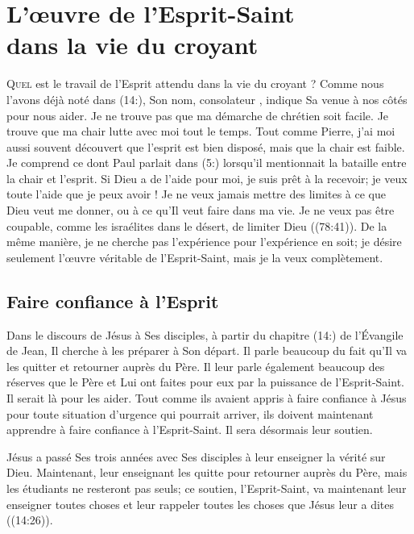 \chapter[L'\oe{}uvre de l'Esprit-Saint dans la vie du croyant]{L'\oe{}uvre de l'Esprit-Saint\\ dans la vie du croyant}

\lettrine{Q}{uel} est le travail de l'Esprit
 attendu dans la vie du croyant ?
 Comme nous l'avons déjà noté dans (14:), Son nom,
 \og con\-so\-la\-teur \fg{}, indique Sa venue à nos côtés pour nous aider.
 Je ne trouve pas que ma démarche de chrétien soit facile.
 Je trouve que ma chair lutte avec moi tout le temps.
 Tout comme Pierre, j'ai moi aussi souvent découvert que l'esprit
 est bien disposé, mais que la chair est faible.
 Je comprend ce dont Paul parlait dans (5:) lorsqu'il
 mentionnait la bataille entre la chair et l'esprit.
 Si Dieu a de l'aide pour moi, je suis prêt à la recevoir;
 je veux toute l'aide que je peux avoir !
 Je ne veux jamais mettre des limites à ce que Dieu veut me donner,
 ou à ce qu'Il veut faire dans ma vie. Je ne veux pas être coupable,
 comme les israélites dans le désert,
 de limiter Dieu ((78:41)).
 De la même manière, je ne cherche pas l'expérience
 pour l'expérience en soit; je désire seulement l'œuvre véritable
 de l'Esprit-Saint, mais je la veux complètement.

\section*{Faire confiance à l'Esprit}

Dans le discours de Jésus à Ses disciples, à partir du chapitre
 (14:) de l'Évangile de Jean,
 Il cherche à les préparer à Son départ.
 Il parle beaucoup du fait qu'Il va les quitter et retourner auprès du Père.
 Il leur parle également beaucoup des réserves que le Père et Lui
 ont faites pour eux par la puissance de l'Esprit-Saint.
 Il serait là pour les aider. Tout comme ils avaient appris à faire confiance
 à Jésus pour toute situation d'urgence qui pourrait arriver,
 ils doivent maintenant apprendre à faire confiance à l'Esprit-Saint.
 Il sera désormais leur soutien.

Jésus a passé Ses trois années avec Ses disciples à leur enseigner
 la vérité sur Dieu. Maintenant, leur enseignant les quitte pour retourner
 auprès du Père, mais les étudiants ne resteront pas seuls;
 ce soutien, l'Esprit-Saint, va maintenant leur enseigner toutes choses
 et leur rappeler toutes les choses que Jésus leur a dites
 ((14:26)).

